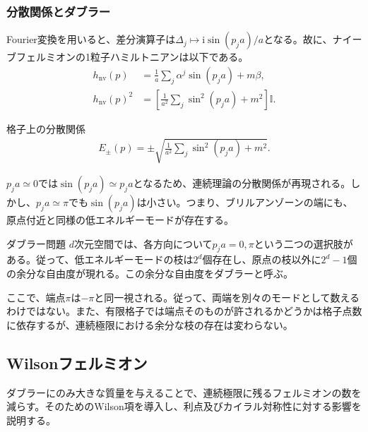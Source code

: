 \documentclass[a4paper,10.5pt]{article}
\numberwithin{equation}{section}
\providecommand{\ii}{\mathrm{i}}
\providecommand{\id}{\mathbb{I}}
\providecommand{\nv}{\mathrm{nv}}
\begin{document}
\subsubsection{分散関係とダブラー}
Fourier変換を用いると、差分演算子は$\Delta_j\mapsto\ii\sin(p_ja)/a$となる。故に、ナイーブフェルミオンの1粒子ハミルトニアンは以下である。
\begin{align}
h_{\nv}(p)&=\frac1a\sum_j\alpha^j\sin(p_ja)+m\beta,\\
h_{\nv}(p)^2&=\left[\frac1{a^2}\sum_j\sin^2(p_ja)+m^2\right]\id.
\end{align}
\begin{resultbox}{格子上の分散関係}
\begin{align}
E_\pm(p)=\pm\sqrt{\frac1{a^2}\sum_j\sin^2(p_ja)+m^2}.
\label{eq:disp-naive}
\end{align}
\end{resultbox}
$p_ja\simeq0$では$\sin(p_ja)\simeq p_ja$となるため、連続理論の分散関係が再現される。しかし、$p_ja\simeq\pi$でも$\sin(p_ja)$は小さい。つまり、ブリルアンゾーンの端にも、原点付近と同様の低エネルギーモードが存在する。
\begin{problembox}{ダブラー問題}
$d$次元空間では、各方向について$p_ja=0,\pi$という二つの選択肢がある。従って、低エネルギーモードの枝は$2^d$個存在し、原点の枝以外に$2^d-1$個の余分な自由度が現れる。この余分な自由度をダブラーと呼ぶ。
\end{problembox}
ここで、端点$\pi$は$-\pi$と同一視される。従って、両端を別々のモードとして数えるわけではない。また、有限格子では端点そのものが許されるかどうかは格子点数に依存するが、連続極限における余分な枝の存在は変わらない。

\subsection{Wilsonフェルミオン}
ダブラーにのみ大きな質量を与えることで、連続極限に残るフェルミオンの数を減らす。そのためのWilson項を導入し、利点及びカイラル対称性に対する影響を説明する。
\end{document}

